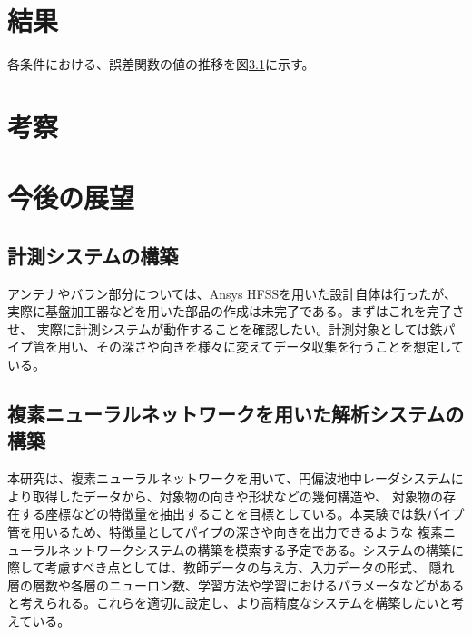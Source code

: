 \documentclass[11pt,a4paper,uplatex,draft]{ujarticle}
\begin{document}
\section{結果}
  各条件における、誤差関数の値の推移を図\ref{}に示す。
  
  
\section{考察}
  

\section{今後の展望}

  \subsection{計測システムの構築}

    アンテナやバラン部分については、Ansys HFSSを用いた設計自体は行ったが、実際に基盤加工器などを用いた部品の作成は未完了である。まずはこれを完了させ、
    実際に計測システムが動作することを確認したい。計測対象としては鉄パイプ管を用い、その深さや向きを様々に変えてデータ収集を行うことを想定している。

  \subsection{複素ニューラルネットワークを用いた解析システムの構築}\label{CVNN_plan}

    本研究は、複素ニューラルネットワークを用いて、円偏波地中レーダシステムにより取得したデータから、対象物の向きや形状などの幾何構造や、
    対象物の存在する座標などの特徴量を抽出することを目標としている。本実験では鉄パイプ管を用いるため、特徴量としてパイプの深さや向きを出力できるような
    複素ニューラルネットワークシステムの構築を模索する予定である。システムの構築に際して考慮すべき点としては、教師データの与え方、入力データの形式、
    隠れ層の層数や各層のニューロン数、学習方法や学習におけるパラメータなどがあると考えられる。これらを適切に設定し、より高精度なシステムを構築したいと考えている。




\end{document}
